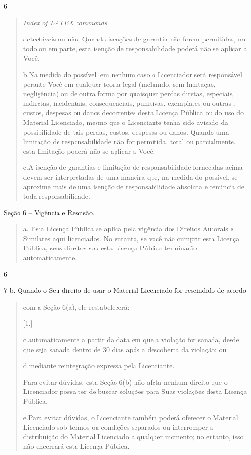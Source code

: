 \documentclass[
]{article}
\begin{document}
6

\begin{quote}
\emph{Index of LATEX commands}

detectáveis ou não. Quando isenções de garantia não forem permitidas, no
todo ou em parte, esta isenção de responsabilidade poderá não se aplicar
a Você.

b.Na medida do possível, em nenhum caso o Licenciador será responsável
perante Você em qualquer teoria legal (incluindo, sem limitação,
negligência) ou de outra forma por quaisquer perdas diretas, especiais,
indiretas, incidentais, consequenciais, punitivas, exemplares ou outras
, custos, despesas ou danos decorrentes desta Licença Pública ou do uso
do Material Licenciado, mesmo que o Licenciante tenha sido avisado da
possibilidade de tais perdas, custos, despesas ou danos. Quando uma
limitação de responsabilidade não for permitida, total ou parcialmente,
esta limitação poderá não se aplicar a Você.

c.A isenção de garantias e limitação de responsabilidade fornecidas
acima devem ser interpretadas de uma maneira que, na medida do possível,
se aproxime mais de uma isenção de responsabilidade absoluta e renúncia
de toda responsabilidade.
\end{quote}

Seção 6 -- Vigência e Rescisão.

\begin{quote}
a. Esta Licença Pública se aplica pela vigência dos Direitos Autorais e
Similares aqui licenciados. No entanto, se você não cumprir esta Licença
Pública, seus direitos sob esta Licença Pública terminarão
automaticamente.
\end{quote}

6

7 b. Quando o Seu direito de usar o Material Licenciado for rescindido
de acordo

\begin{quote}
com a Seção 6(a), ele restabelecerá:

{[}1.{]}

c.automaticamente a partir da data em que a violação for sanada, desde
que seja sanada dentro de 30 dias após a descoberta da violação; ou

d.mediante reintegração expressa pela Licenciante.

Para evitar dúvidas, esta Seção 6(b) não afeta nenhum direito que o
Licenciador possa ter de buscar soluções para Suas violações desta
Licença Pública.

e.Para evitar dúvidas, o Licenciante também poderá oferecer o Material
Licenciado sob termos ou condições separados ou interromper a
distribuição do Material Licenciado a qualquer momento; no entanto, isso
não encerrará esta Licença Pública.
\end{quote}
\end{document}
